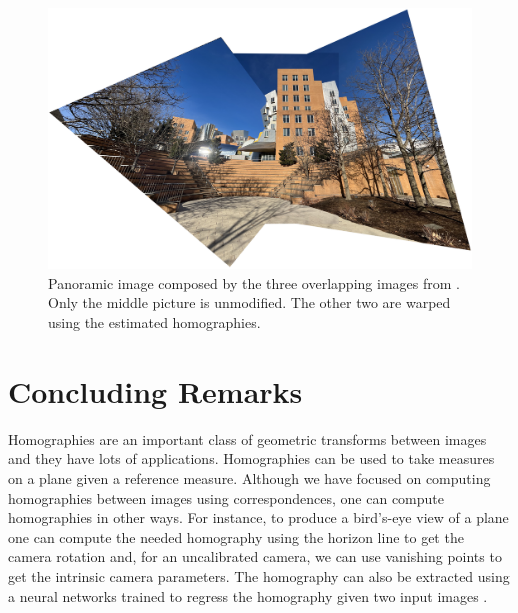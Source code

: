 \begin{figure}
    \centerline{
        \includegraphics[width=1\linewidth]{figures/homography/panorama.jpg}
    }
    \caption{Panoramic image composed by the three overlapping images from \fig{\ref{fig:example_three_images}}. Only the middle picture is unmodified. The other two are warped using the estimated homographies.}
    \label{fig:panorama}
\end{figure}


\section{Concluding Remarks}

Homographies are an important class of geometric transforms between images and they have lots of applications. Homographies can be used to take measures on a plane given a reference measure.  Although we have focused on computing homographies between images using correspondences, one can compute homographies in other ways. For instance, to produce a bird's-eye view of a plane one can compute the needed homography using the horizon line to get the camera rotation and, for an uncalibrated camera, we can use vanishing points to get the intrinsic camera parameters.  The homography can also be extracted using a neural networks trained to regress the homography given two input images \cite{abbas2019geometric}.



